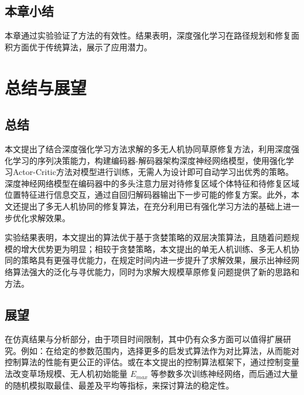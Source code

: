 \documentclass[AutoFakeBold]{LZUThesis}
\begin{document}

\section{本章小结}
本章通过实验验证了方法的有效性。结果表明，深度强化学习在路径规划和修复面积方面优于传统算法，展示了应用潜力。

\chapter{总结与展望}

\section{总结}
本文提出了结合深度强化学习方法求解的多无人机协同草原修复方法，利用深度强化学习的序列决策能力，构建编码器-解码器架构深度神经网络模型，使用强化学习Actor-Critic方法对模型进行训练，无需人为设计即可自动学习出优秀的策略。深度神经网络模型在编码器中的多头注意力层对待修复区域个体特征和待修复区域位置特征进行信息交互，通过自回归解码器输出下一步可能的修复方案。此外，本文还提出了多无人机协同的修复算法，在充分利用已有强化学习方法的基础上进一步优化求解效果。

实验结果表明，本文提出的算法优于基于贪婪策略的双层决策算法，且随着问题规模的增大优势更为明显；相较于贪婪策略，本文提出的单无人机训练、多无人机协同的策略具有更强寻优能力，在规定时间内进一步提升了求解效果，展示出神经网络算法强大的泛化与寻优能力，同时为求解大规模草原修复问题提供了新的思路和方法。

\section{展望}
在仿真结果与分析部分，由于项目时间限制，其中仍有众多方面可以值得扩展研究。例如：在给定的参数范围内，选择更多的启发式算法作为对比算法，从而能对控制算法的性能有更公正的评估。或在本文提出的控制算法框架下，通过控制变量法改变草场规模、无人机初始能量 $E_{max}$ 等参数多次训练神经网络，而后通过大量的随机模拟取最佳、最差及平均等指标，来探讨算法的稳定性。


\backmatter
\printbib



\end{document}
